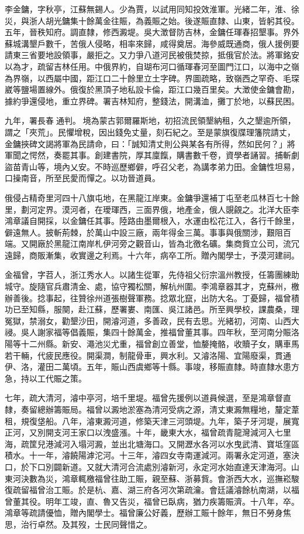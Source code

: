 \begin{pinyinscope}
李金鏞，字秋亭，江蘇無錫人。少為賈，以試用同知投效淮軍。光緒二年，淮、徐災，與浙人胡光鏞集十餘萬金往賑，為義賑之始。後遂賑直隸、山東，皆躬其役。五年，晉秩知府。調直隸，修西澱堤。吳大澂督防吉林，金鏞任琿春招墾事。界外蘇城溝墾戶數千，苦俄人侵略，相率來歸，咸得奠居。海參威既通商，俄人援例要請東三省要地設領事，嚴拒之。又力爭八道河民被俄焚掠，抵俄官於法。將軍銘安以為才，疏留吉林任用。中俄界約，自瑚布河口循琿春河至圖門江口，以海中之嶺為界嶺，以西屬中國，距江口二十餘里立土字碑。界圖疏略，致嶺西之罕奇、毛琛崴等鹽場置線外。俄復於黑頂子地私設卡倫，距江口幾百里矣。大澂使金鏞會勘，據約爭還侵地，重立界碑。署吉林知府，整錢法，開溝洫，攤丁於地，以蘇民困。

九年，署長春通判。境為蒙古郭爾羅斯地，初招流民領墾納租，久之墾逾所領，謂之「夾荒」。民懼增稅，因出錢免丈量，刻石紀之。至是蒙旗復牒理籓院請丈，金鏞挾碑文謁將軍為民請命，曰：「誠知清丈則公與某各有所得，然如民何？」將軍聞之愕然，奏罷其事。創建書院，厚其廩餼，購書數千卷，資學者誦習。捕斬劇盜苗青山等，境內乂安。不時巡歷鄉僻，呼召父老，為講孝弟力田。金鏞性坦易，口操南音，所至民愛而憚之。以功晉道員。

俄侵占精奇里河四十八旗屯地，在黑龍江岸東。金鏞爭還補丁屯至老瓜林百七十餘里，劃河定界。漠河者，在璦琿西，三面界俄，地產金，俄人覬覦之。北洋大臣李鴻章議自開採，以金鏞任其事。陸路由墨爾根入，水運由松花江入，各行千餘里，僻遠無人。披斬荊棘，於萬山中設三廠，兩年得金三萬。事事與俄關涉，艱阻百端。又開廠於黑龍江南岸札伊河旁之觀音山，皆為北徼名礦。集商貲立公司，流冗遠歸，商販漸集，收實邊之利焉。十六年，病卒工所。贈內閣學士，予漠河建祠。

金福曾，字苕人，浙江秀水人。以諸生從軍，先侍祖父衍宗溫州教授，任籌團練助城守。旋隨官兵肅清金、處，協守獨松關，解杭州圍。李鴻章器其才，克蘇州，檄辦善後。捻事起，往贊徐州道張樹聲軍務。捻眾北竄，出防大名。丁憂歸，福曾積功已至知縣，服闋，赴江蘇，歷署婁、南匯、吳江諸邑。所至興學校，課農桑，理冤獄，禁溺女，勸墾沙田，開濬河道，多善政，民有去思。光緒初，河南、山西大祲。吳人謝家福等倡義賑，集四十餘萬金，推福曾董其事。四年秋，至河南分賑洛陽等十二州縣。新安、澠池災尤重，福曾創立善堂，恤嫠掩骼，收贖子女，購車馬若干輛，代疲民應役。開渠澗，制龍骨車，興水利。又濬洛陽、宜陽廢渠，貫通伊、洛，灌田二萬頃。五年，賑山西虞鄉等十縣。事竣，移賑直隸。時直隸水患方急，持以工代賑之策。

七年，疏大清河，濬中亭河，培千里堤。福曾先援例以道員候選，至是鴻章督直隸，奏留總辦籌賑局。福曾以澱地淤塞為清河受病之源，清丈東澱無糧地，釐定葦租，規復垡船。八年，濬東澱河道，修築天津三河頭堤。九年，築子牙河堤，展寬正河，又別開支河王家口以洩盛漲。十年，畿東大水，福曾疏青龍灣減河入七里海，疏筐兒港減河入塌河澱，並出北塘海口。又開瀝水各河以水曳武清、寶坻窪區積水。十一年，濬饒陽滹沱河。十三年，濬四女寺南運減河。兩署永定河道，塞決口，於下口別闢新道。又就大清河合流處別濬新河，永定河水始直達天津海河。山東河決數為災，鴻章輒檄福曾往助工賑，親至蘇、浙募貲。會浙西大水，巡撫崧駿復疏留福曾治工賑。於是杭、嘉、湖三府各河次第疏瀹。會廷議濬餘杭南湖，以福曾董其役。明年工竣，直、魯又告災，福曾已臥病，猶力疾籌賑濟。十八年，卒。鴻章等疏請優恤，贈內閣學士。福曾廉公好義，歷辦工賑十餘年，無日不勞身焦思，治行卓然。及其歿，士民同聲惜之。


\end{pinyinscope}
